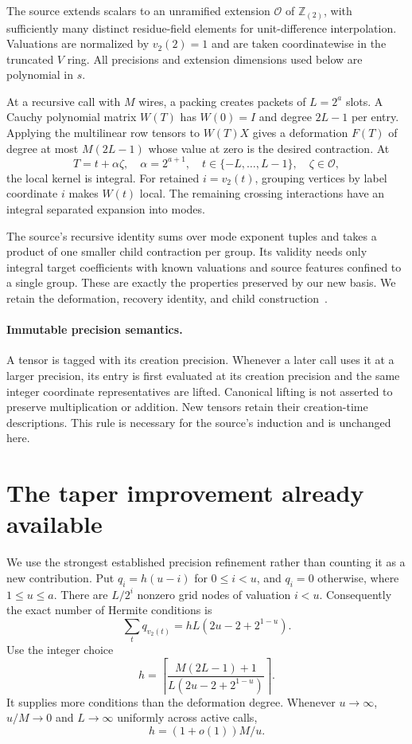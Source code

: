 \documentclass[11pt,letterpaper]{article}
\theoremstyle{definition}\newtheorem{definition}[theorem]{Definition}
\theoremstyle{remark}\newtheorem{remark}[theorem]{Remark}
\newcommand{\Z}{\mathbb Z}
\newcommand{\OO}{\mathcal O}
\newcommand{\ceil}[1]{\left\lceil#1\right\rceil}
\begin{document}
The source extends scalars to an unramified extension
$\OO$ of $\Z_{(2)}$, with sufficiently many distinct residue-field
elements for unit-difference interpolation. Valuations are normalized by
$v_2(2)=1$ and are taken coordinatewise in the truncated $V$ ring.
All precisions and extension dimensions used below are polynomial in $s$.

At a recursive call with $M$ wires, a packing creates packets of
$L=2^a$ slots. A Cauchy polynomial matrix $W(T)$ has $W(0)=I$ and
degree $2L-1$ per entry. Applying the multilinear row tensors to
$W(T)X$ gives a deformation $F(T)$ of degree at most
$M(2L-1)$ whose value at zero is the desired contraction. At
\[
 T=t+\alpha\zeta,\quad
 \alpha=2^{a+1},\quad t\in\{-L,\ldots,L-1\},\quad\zeta\in\OO,
\]
the local kernel is integral. For retained $i=v_2(t)$, grouping vertices
by label coordinate $i$ makes $W(t)$ local. The remaining crossing
interactions have an integral separated expansion into modes.

The source's recursive identity sums over mode exponent tuples and takes
a product of one smaller child contraction per group. Its validity needs
only integral target coefficients with known valuations and source
features confined to a single group. These are exactly the properties
preserved by our new basis. We retain the deformation, recovery identity,
and child construction~\cite{contraction}.

\paragraph{Immutable precision semantics.}
A tensor is tagged with its creation precision. Whenever a later call
uses it at a larger precision, its entry is first evaluated at its creation
precision and the same integer coordinate representatives are lifted.
Canonical lifting is not asserted to preserve multiplication or addition.
New tensors retain their creation-time descriptions. This rule is
necessary for the source's induction and is unchanged here.

\section{The taper improvement already available}\label{sec:taper}
We use the strongest established precision refinement rather than counting
it as a new contribution. Put $q_i=h(u-i)$ for $0\le i<u$, and $q_i=0$
otherwise, where $1\le u\le a$. There are $L/2^i$ nonzero grid nodes of
valuation $i<u$. Consequently the exact number of Hermite conditions is
\begin{equation}\label{eq:hermitecount}
 \sum_t q_{v_2(t)}=hL(2u-2+2^{1-u}).
\end{equation}
Use the integer choice
\begin{equation}\label{eq:hchoice}
 h=\ceil{\frac{M(2L-1)+1}{L(2u-2+2^{1-u})}}.
\end{equation}
It supplies more conditions than the deformation degree. Whenever
$u\longrightarrow\infty$, $u/M\longrightarrow0$ and $L\longrightarrow\infty$
uniformly across active calls,
\begin{equation}\label{eq:hscale}h=(1+o(1))M/u.\end{equation}
\end{document}
